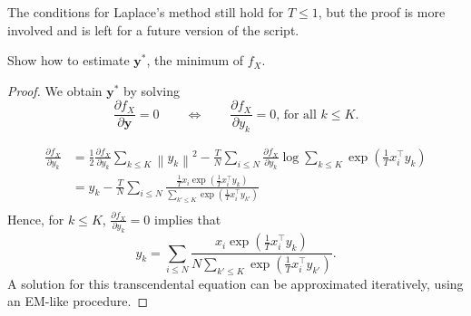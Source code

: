 
The conditions for Laplace's method still hold for $T \leq 1$, but the proof is more involved and is left for a future version of the script.

\begin{exercise}
Show how to estimate $\mathbf{y}^*$, the minimum of $f_X$.
\end{exercise}

\begin{proof}
We obtain $\mathbf{y}^*$ by solving
%
\begin{equation}
\frac{\partial f_X}{\partial \mathbf{y}}= 0 \qquad \Leftrightarrow \qquad \frac{\partial f_X}{\partial y_k} = 0\text{, for all $k \leq K$}.
\end{equation}
%

\begin{align*}
\frac{\partial f_X}{\partial y_k} &= \frac{1}{2}\frac{\partial f_X}{\partial y_k}\sum_{k \leq K}\left\|y_k\right\|^2 - \frac{T}{N}\sum_{i \leq N}\frac{\partial f_X}{\partial y_k}\log\sum_{k \leq K}\exp\left(\frac{1}{T}x_i^\top y_k\right)\\
&= y_k - \frac{T}{N}\sum_{i \leq N}\frac{\frac{1}{T}x_i\exp\left(\frac{1}{T}x_i^\top y_k\right)}{\sum_{k' \leq K}\exp\left(\frac{1}{T}x_i^\top y_{k'}\right)}\\
\end{align*}
%
Hence, for $k \leq K$, $\frac{\partial f_X}{\partial y_k}= 0$ implies that 
%
$$y_k = \sum_{i \leq N}\frac{x_i\exp\left(\frac{1}{T}x_i^\top y_k\right)}{N\sum_{k' \leq K}\exp\left(\frac{1}{T}x_i^\top y_{k'}\right)}.$$
%
A solution for this transcendental equation can be approximated iteratively, using an EM-like procedure.
\end{proof}


